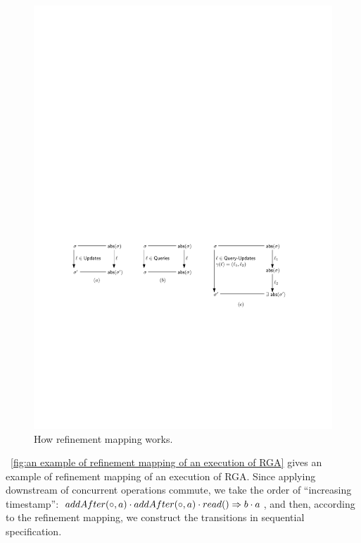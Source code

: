 \begin{figure}[t]
  \centering
  \includegraphics[width=0.8 \textwidth]{figures/RefinementMapping.pdf}
\vspace{-10pt}
  \caption{How refinement mapping works.}
  \label{fig:how refinement mapping works}
\end{figure}



\figurename~\ref{fig:an example of refinement mapping of an execution of RGA} gives an example of refinement mapping of an execution of RGA. Since applying downstream of concurrent operations commute, we take the order of ``increasing timestamp'': $\alabelshort[addAfter]{\circ,a} \cdot \alabelshort[addAfter]{\circ,a} \cdot \alabellong[read]{}{b \cdot a}{}$, and then, according to the refinement mapping, we construct the transitions in sequential specification. 

